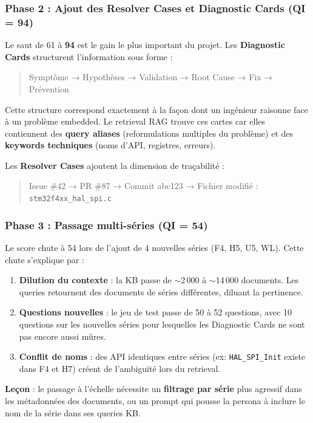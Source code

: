 \subsubsection{Phase 2 : Ajout des Resolver Cases et Diagnostic Cards (QI = 94)}

Le saut de 61 à \textbf{94} est le gain le plus important du projet. Les \textbf{Diagnostic Cards} structurent l'information sous forme :

\begin{quote}
Symptôme → Hypothèses → Validation → Root Cause → Fix → Prévention
\end{quote}

Cette structure correspond exactement à la façon dont un ingénieur raisonne face à un problème embedded. Le retrieval RAG trouve ces cartes car elles contiennent des \textbf{query aliases} (reformulations multiples du problème) et des \textbf{keywords techniques} (noms d'API, registres, erreurs).

Les \textbf{Resolver Cases} ajoutent la dimension de traçabilité :
\begin{quote}
Issue \#42 → PR \#87 → Commit abc123 → Fichier modifié : \texttt{stm32f4xx\_hal\_spi.c}
\end{quote}

\subsubsection{Phase 3 : Passage multi-séries (QI = 54)}

Le score chute à 54 lors de l'ajout de 4 nouvelles séries (F4, H5, U5, WL). Cette chute s'explique par :

\begin{enumerate}
  \item \textbf{Dilution du contexte} : la KB passe de $\sim$2\,000 à $\sim$14\,000 documents. Les queries retournent des documents de séries différentes, diluant la pertinence.
  \item \textbf{Questions nouvelles} : le jeu de test passe de 50 à 52 questions, avec 10 questions sur les nouvelles séries pour lesquelles les Diagnostic Cards ne sont pas encore aussi mûres.
  \item \textbf{Conflit de noms} : des API identiques entre séries (ex: \texttt{HAL\_SPI\_Init} existe dans F4 et H7) créent de l'ambiguïté lors du retrieval.
\end{enumerate}

\textbf{Leçon} : le passage à l'échelle nécessite un \textbf{filtrage par série} plus agressif dans les métadonnées des documents, ou un prompt qui pousse la persona à inclure le nom de la série dans ses queries KB.

